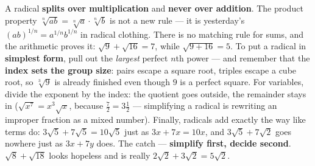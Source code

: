 \documentclass[10pt]{article}
\begin{document}
\vspace{0.10in}

\begin{remindbox}
\small A radical \textbf{splits over multiplication} and \textbf{never over addition}. The product
property $\sqrt[n]{ab}=\sqrt[n]{a}\cdot\sqrt[n]{b}$ is not a new rule --- it is yesterday's
$(ab)^{1/n}=a^{1/n}b^{1/n}$ in radical clothing. There is no matching rule for sums, and the
arithmetic proves it: $\sqrt{9}+\sqrt{16}=7$, while $\sqrt{9+16}=5$. To put a radical in
\textbf{simplest form}, pull out the \emph{largest} perfect $n$th power --- and remember that the
\textbf{index sets the group size}: pairs escape a square root, triples escape a cube root, so
$\sqrt[3]{9}$ is already finished even though $9$ is a perfect square. For variables, divide the
exponent by the index: the quotient goes outside, the remainder stays in
($\sqrt{x^{7}}=x^{3}\sqrt{x}$, because $\frac{7}{2}=3\frac{1}{2}$ --- simplifying a radical is
rewriting an improper fraction as a mixed number). Finally, radicals add exactly the way like terms
do: $3\sqrt5+7\sqrt5=10\sqrt5$ just as $3x+7x=10x$, and $3\sqrt5+7\sqrt2$ goes nowhere just as
$3x+7y$ does. The catch --- \textbf{simplify first, decide second}. $\sqrt{8}+\sqrt{18}$ looks
hopeless and is really $2\sqrt2+3\sqrt2=5\sqrt2$.
\end{remindbox}
\end{document}
